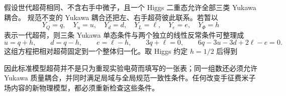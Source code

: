 \begin{proposition}[最小场谱的相对超荷]
假设世代超荷相同、不含右手中微子，且一个 Higgs 二重态允许全部三类 Yukawa 耦合。
规范不变的 Yukawa 耦合还把左、右手超荷彼此联系。若暂以
\begin{equation*}
 Y_Q=q,\quad Y_u=u,\quad Y_d=d,\quad
 Y_L=\ell,\quad Y_e=e,\quad Y_\Phi=h
\end{equation*}
表示一代超荷，则三条 Yukawa 单态条件与两个独立的线性反常条件可整理成
\begin{equation}
{
 u=q+h,\qquad d=q-h,\qquad e=\ell-h,\qquad
 3q+\ell=0,\qquad
 6q-3u-3d+2\ell-e=0.}
\label{eq:sm-hypercharge-constraint-system-dp68}
\end{equation}
这组方程把相对超荷固定到一个整体归一化。取 Higgs 约定 $h=1/2$ 后得到

因此标准模型超荷并不是只为重现实验电荷而填写的一张表；同一组数还必须允许 Yukawa 质量耦合，并同时满足局域与全局规范一致性条件。任何改变手征费米子场内容的新物理模型，都必须重新检查这些条件。

\end{proposition}

